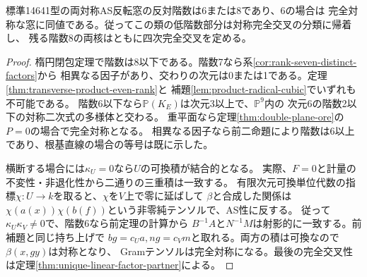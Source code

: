 \begin{theorem}[両対称AS窓の階数二分法]\label{thm:bisymmetric-six-or-eight}
標準14641型の両対称AS反転窓の反対階数は6または8であり、6の場合は
完全対称な窓に同値である。従ってこの類の低階数部分は対称完全交叉の分類に帰着し、
残る階数8の両核はともに四次完全交叉を定める。
\end{theorem}
\begin{proof}
楕円閉包定理で階数は8以下である。階数7なら系\ref{cor:rank-seven-distinct-factors}から
相異なる因子があり、交わりの次元は0または1である。定理\ref{thm:transverse-product-even-rank}と
補題\ref{lem:product-radical-cubic}でいずれも不可能である。
階数6以下なら$\mathbb P(K_E)$は次元3以上で、$\mathbb P^9$内の
次元6の階数2以下の対称二次式の多様体と交わる。
重平面なら定理\ref{thm:double-plane-ore}の$P=0$の場合で完全対称となる。
相異なる因子なら前二命題により階数は6以上であり、根基直線の場合の等号は既に示した。

横断する場合には$\kappa_U=0$なら$U$の可換積が結合的となる。
実際、$F=0$と計量の不変性・非退化性から二通りの三重積は一致する。
有限次元可換単位代数の指標$\chi:U\to k$を取ると、$\chi$を$V$上で零に延ばして
$\beta$と合成した関係は$\chi(a(x))\chi(b(f))$という非零純テンソルで、AS性に反する。
従って$\kappa_U\kappa_V\ne0$で、階数6なら前定理の計算から
$B^{-1}A$と$N^{-1}M$は射影的に一致する。前補題と同じ持ち上げで
$b g=c_U a,n g=c_V m$と取れる。両方の積は可換なので$\beta(x,gy)$は対称となり、
Gramテンソルは完全対称になる。最後の完全交叉性は定理\ref{thm:unique-linear-factor-partner}による。
\end{proof}
